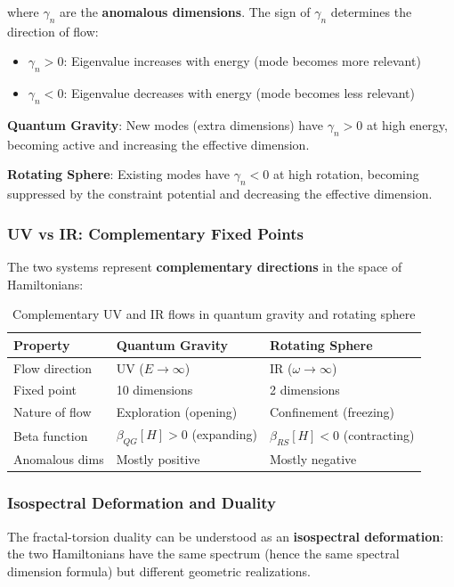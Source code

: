 \documentclass[UTF8]{ctex}\n\documentclass[12pt,a4paper]{article}
\begin{document}
where $\gamma_n$ are the \textbf{anomalous dimensions}. The sign of $\gamma_n$ determines the direction of flow:
\begin{itemize}
    \item $\gamma_n > 0$: Eigenvalue increases with energy (mode becomes more relevant)
    \item $\gamma_n < 0$: Eigenvalue decreases with energy (mode becomes less relevant)
\end{itemize}

\textbf{Quantum Gravity}: New modes (extra dimensions) have $\gamma_n > 0$ at high energy, becoming active and increasing the effective dimension.

\textbf{Rotating Sphere}: Existing modes have $\gamma_n < 0$ at high rotation, becoming suppressed by the constraint potential and decreasing the effective dimension.

\subsubsection{UV vs IR: Complementary Fixed Points}

The two systems represent \textbf{complementary directions} in the space of Hamiltonians:

\begin{table}[h]
\centering
\begin{tabular}{p{3cm}p{5cm}p{5cm}}
\toprule
\textbf{Property} & \textbf{Quantum Gravity} & \textbf{Rotating Sphere} \\
\midrule
Flow direction & UV ($E \to \infty$) & IR ($\omega \to \infty$) \\
Fixed point & 10 dimensions & 2 dimensions \\
Nature of flow & Exploration (opening) & Confinement (freezing) \\
Beta function & $\beta_{QG}[H] > 0$ (expanding) & $\beta_{RS}[H] < 0$ (contracting) \\
Anomalous dims & Mostly positive & Mostly negative \\
\bottomrule
\end{tabular}
\caption{Complementary UV and IR flows in quantum gravity and rotating sphere}
\end{table}

\subsubsection{Isospectral Deformation and Duality}

The fractal-torsion duality can be understood as an \textbf{isospectral deformation}: the two Hamiltonians have the same spectrum (hence the same spectral dimension formula) but different geometric realizations.
\end{document}
